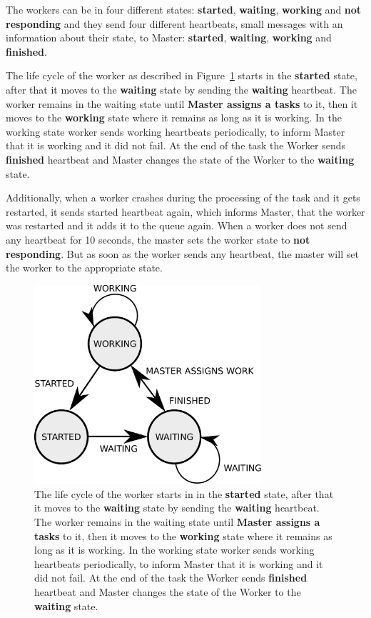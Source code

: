 The workers can be in four different states:
  \textbf{started}, \textbf{waiting}, \textbf{working} and \textbf{not responding}
  and they send four different heartbeats, small messages with an information about their state, to Master:
  \textbf{started}, \textbf{waiting}, \textbf{working} and \textbf{finished}.

The life cycle of the worker as described in Figure~\ref{fig:worker-state} starts in the \textbf{started} state,
  after that it moves to the \textbf{waiting} state by sending the \textbf{waiting} heartbeat.
The worker remains in the waiting state until \textbf{Master assigns a tasks} to it,
  then it moves to the \textbf{working} state
  where it remains as long as it is working.
In the working state worker sends working heartbeats periodically,
  to inform Master that it is working and it did not fail.
At the end of the task the Worker sends \textbf{finished} heartbeat
  and Master changes the state of the Worker to the \textbf{waiting} state.

Additionally, when a worker crashes during the processing of the task and it gets restarted,
  it sends started heartbeat again,
  which informs Master, that the worker was restarted and it adds it to the queue again.
When a worker does not send any heartbeat for 10 seconds,
  the master sets the worker state to \textbf{not responding}.
But as soon as the worker sends any heartbeat,
  the master will set the worker to the appropriate state.

\begin{figure}[h]
  \centering
  \includegraphics[width=0.75\textwidth]{./img/worker-state.pdf}

  \caption{
    The life cycle of the worker starts in in the \textbf{started} state,
      after that it moves to the \textbf{waiting} state by sending the \textbf{waiting} heartbeat.
    The worker remains in the waiting state until \textbf{Master assigns a tasks} to it,
      then it moves to the \textbf{working} state
      where it remains as long as it is working.
    In the working state worker sends working heartbeats periodically,
      to inform Master that it is working and it did not fail.
    At the end of the task the Worker sends \textbf{finished} heartbeat
      and Master changes the state of the Worker to the \textbf{waiting} state.
  }
  \label{fig:worker-state}
\end{figure}

